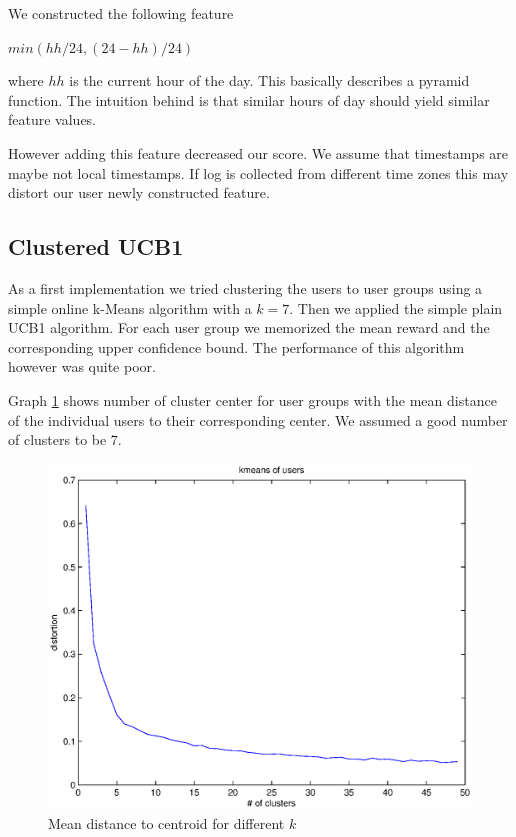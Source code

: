 \documentclass[a4paper, 11pt]{article}
\begin{document}
We constructed the following feature 

$ min\left(  hh / 24, (24 - hh) / 24\right)$

where $hh$ is the current hour of the day. This basically describes a pyramid function. The intuition behind is that similar hours of day should yield similar feature values.

However adding this feature decreased our score. We assume that timestamps are maybe not local timestamps. If log is collected from different time zones this may distort our user newly constructed feature.


\subsection{Clustered UCB1}
As a first implementation we tried clustering the users to user groups using a simple online k-Means algorithm with a $k=7$. Then we applied the simple plain UCB1 algorithm. For each user group we memorized the mean reward and the corresponding upper confidence bound. The performance of this algorithm however was quite poor.

Graph \ref{fig:proj4-kmeans_users} shows number of cluster center for user groups with the mean distance of the individual users to their corresponding center. We assumed a good number of clusters to be $7$.

\begin{figure}[H]
\centering
\includegraphics[scale=0.5]{project4/kmeans_users.eps}
\caption{Mean distance to centroid for different $k$}
\label{fig:proj4-kmeans_users}
\end{figure}
\end{document}
